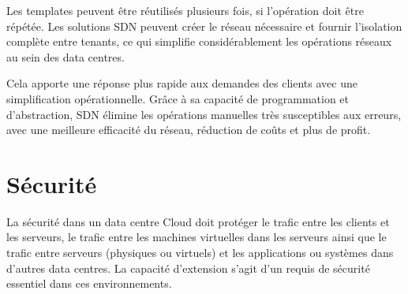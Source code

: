 Les templates peuvent être réutilisés plusieurs fois, si l'opération doit être répétée. Les solutions SDN peuvent créer le réseau nécessaire et fournir l'isolation complète entre tenants, ce qui simplifie considérablement les opérations réseaux au sein des data centres. 

Cela apporte une réponse plus rapide aux demandes des clients avec une simplification opérationnelle. Grâce à sa capacité de programmation et d'abstraction, SDN élimine les opérations manuelles très susceptibles aux erreurs, avec une meilleure efficacité du réseau, réduction de coûts et plus de profit.

\section{Sécurité}

La sécurité dans un data centre Cloud doit protéger le trafic entre les clients et les serveurs, le trafic entre les machines virtuelles dans les serveurs ainsi que le trafic entre serveurs (physiques ou virtuels) et les applications ou systèmes dans d'autres data centres. La capacité d'extension s'agit d'un requis de sécurité essentiel dans ces environnements. 





